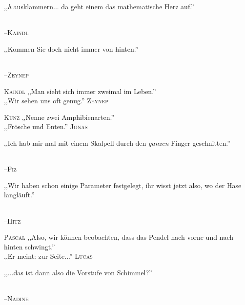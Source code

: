 \vspace{3mm}
{\raggedright ,,\emph{h} ausklammern... da geht einem das mathematische Herz auf.''}\\
\raggedleft \textsc{\footnotesize --\/Kaindl}\\

\vspace{3mm}
{\raggedright ,,Kommen Sie doch nicht immer von hinten.''}\\
\raggedleft \textsc{\footnotesize --\/Zeynep}\\

\vspace{3mm}
\hangindent=0.7cm
\raggedright \textsc{\footnotesize Kaindl} ,,Man sieht sich immer zweimal im Leben.''\\
\raggedleft ,,Wir sehen uns oft genug.'' \textsc{\footnotesize Zeynep}\\

\vspace{3mm}
\hangindent=0.7cm
\raggedright \textsc{\footnotesize Kunz} ,,Nenne zwei Amphibienarten.''\\
\raggedleft ,,Frösche und Enten.'' \textsc{\footnotesize Jonas}\\

\vspace{3mm}
{\raggedright ,,Ich hab mir mal mit einem Skalpell durch den \emph{ganzen} Finger geschnitten.''}\\
\raggedleft \textsc{\footnotesize --\/Fiz}\\

\vspace{3mm}
{\raggedright ,,Wir haben schon einige Parameter festgelegt, ihr wisst jetzt also, wo der Hase langläuft.''}\\
\raggedleft \textsc{\footnotesize --\/Hitz}\\

\vspace{3mm}
\hangindent=0.7cm
\raggedright \textsc{\footnotesize Pascal} ,,Also, wir können beobachten, dass das Pendel nach vorne und nach hinten schwingt.''\\
\raggedleft ,,Er meint: zur Seite...'' \textsc{\footnotesize Lucas}\\

\vspace{3mm}
{\raggedright ,,...das ist dann also die Vorstufe von Schimmel?''}\\
\raggedleft \textsc{\footnotesize --\/Nadine}\\

